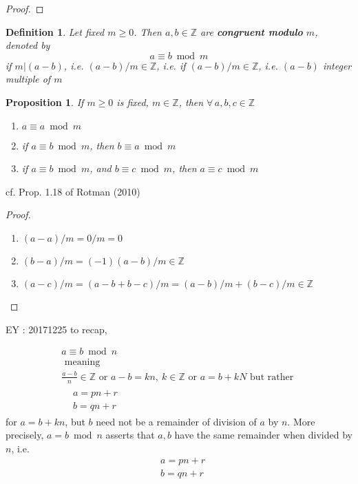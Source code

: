 \documentclass[10pt]{amsart}
\newtheorem{proposition}{Proposition}
\newtheorem{definition}{Definition}
\begin{document}
\begin{multicols*}{2}
\begin{proof}
	\end{proof}

\begin{definition}
	Let fixed $m\geq 0$.  Then $a,b \in \mathbb{Z}$ are \textbf{congruent modulo } $m$, denoted by 
	\[
	a \equiv b \bmod{m} 
	\]
if $m|(a-b)$, i.e. $(a-b)/m \in \mathbb{Z}$, i.e. if $(a-b)/m\in\mathbb{Z}$, i.e. $(a-b)$ integer multiple of $m$
\end{definition}

\begin{proposition}
	If $m\geq 0$ is fixed, $m\in \mathbb{Z}$, then $\forall \, a,b,c \in \mathbb{Z}$
	\begin{enumerate}
		\item $a \equiv a\bmod{m}$ 
		\item if $a \equiv b\bmod{m}$, then $b \equiv a\bmod{m}$
		\item if $a \equiv b\bmod{m}$, and $b \equiv c\bmod{m}$, then $a \equiv c\bmod{m}$
	\end{enumerate}
\end{proposition}

cf. Prop. 1.18 of Rotman (2010) \cite{JRotman2010}

\begin{proof}
	\begin{enumerate}
		\item $(a-a)/m=0/m=0$
		\item $(b-a)/m=(-1)(a-b)/m \in \mathbb{Z}$
		\item $(a-c)/m=(a-b+b-c)/m=(a-b)/m+(b-c)/m\in\mathbb{Z}$  
	\end{enumerate}
\end{proof}

EY : 20171225 to recap, 

\begin{equation}
\boxed{ 
	\begin{gathered}
	a \equiv b \bmod{n} \\
	\text{ meaning } \\ 
	\frac{a-b}{n} \in \mathbb{Z} \text{ or }  a- b =kn, \  k\in \mathbb{Z} \text{ or } a  = b+kN \text{ but rather } \\
	\begin{aligned}
	& a = pn + r \\
	& b= qn +r
	\end{aligned}
	\end{gathered}	
}
\end{equation}
for $a= b+ kn$, but $b$ need not be a remainder of division of $a$ by $n$.  More precisely, $a= b\bmod{n}$ asserts that $a,b$ have the same remainder when divided by $n$, i.e. 
\[
\begin{aligned}
& a = pn + r \\ 
& b = qn + r
\end{aligned}
\]



\end{multicols*}
\end{document}
